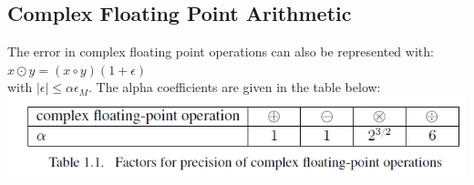 \documentclass[english]{latex4ei/latex4ei_sheet}
\begin{document}
\begin{sectionbox}

    \subsection{Complex Floating Point Arithmetic}
    The error in complex floating point operations can also be represented with:\\
    $x\odot y= (x\circ y)(1+\epsilon)$\\

    with $|\epsilon|\leq \alpha \epsilon_M$. The alpha coefficients are given in the table below:\\

    \includegraphics[width=\textwidth]{img/cplx_fl_op.png}

\end{sectionbox}
\end{document}
